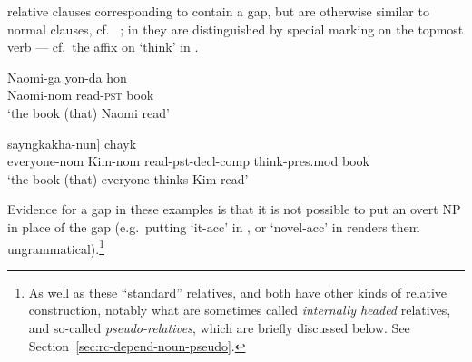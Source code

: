 \documentclass[output=paper
 	        ,biblatex
                ,babelshorthands
                ,newtxmath
                ,draftmode
                ,colorlinks, citecolor=brown
]{langscibook}
\begin{document}
relative clauses corresponding to  contain a gap, but are otherwise similar to
normal clauses, cf.\  \citep[from][18]{SiraiGunjiRelative}; in  they are
distinguished by special marking on the topmost verb --- cf.\ the  affix on
 `think' in 
\citep[from][285]{Kim16SyntacticStrKorean}.
\begin{exe}\ex\label{x:rc-81}
\gll Naomi-ga \trace{} yon-da hon\\
     Naomi-{\sc nom} {} read-\textsc{pst} book\\
\glt `the book (that) Naomi read'
\end{exe}
\begin{exe}\ex\label{x:rc-82}
 \gll [motwu-ka           [Kim-i       \trace\subscr{i} ilk-ess-ta-ko]  sayngkakha-nun] chayk \\
      \hphantom{[}everyone-{\sc nom} \hphantom{[}Kim-{\sc nom}  {}     read-{\sc pst-decl-comp} think-{\sc pres.mod}   book\\
 \glt `the book (that) everyone thinks Kim read'  
\end{exe}
Evidence for a gap in these examples is that it is not possible to put an overt NP in
place of the gap (e.g.\ putting  `it-{\sc acc}' in , or
 `novel-{\sc acc}' in  renders them ungrammatical).\footnote{As
  well as these ``standard'' relatives,  and  both have other kinds of
  relative construction, notably what are sometimes called \emph{internally headed} relatives, and so-called
  \emph{pseudo-relatives}, which are briefly discussed below. See
  Section~\ref{sec:rc-depend-noun-pseudo}.}
\end{document}
